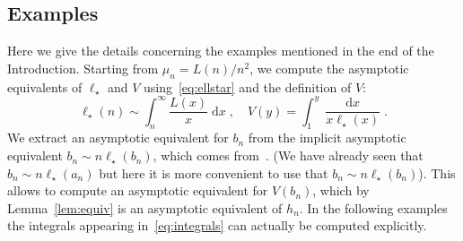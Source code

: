 \documentclass[10pt]{amsart}
\theoremstyle{definition}\newtheorem{defi}[theo]{Definition}\newtheorem{rema}[theo]{Remark}\newtheorem{exam}[theo]{Example}\newtheorem{exem}[theo]{Example}\newtheorem{nota}[theo]{Notation}
\DeclareMathOperator{\dxseq}{d\mathit{x}}
\begin{document}
\subsection{Examples}\label{ssec:examples}

Here we give the details concerning the examples mentioned in the end of the Introduction. Starting from $ \mu_n= {L(n)}/{n^{2}}$, we compute the asymptotic equivalents of $\ell_{\star}$ and $V$ using~\eqref{eq:ellstar} and the definition of $V$:
\begin{equation}\label{eq:integrals}
\ell_{\star}(n)  \sim  \int_{n}^{\infty} \frac{L(x)}{x} \dxseq, \quad V(y)=\int_{1}^{y} \frac{\dxseq}{x \ell_{\star}(x)}.
\end{equation}
We extract an asymptotic equivalent for $b_{n}$ from the implicit asymptotic equivalent $ b_{n} \sim n \ell_{\star}(b_{n})$, which comes from~\cite[Lemma~4.3]{Ber19}. (We have already seen that $ b_{n} \sim n \ell_{\star}(a_{n})$ but here it is more convenient to use that $ b_{n} \sim n \ell_{\star}(b_{n})$). This allows to compute an asymptotic equivalent for $V(b_{n})$, which by Lemma~\ref{lem:equiv} is an asymptotic equivalent of $h_{n}$. In the following examples the integrals appearing in~\eqref{eq:integrals} can actually be computed explicitly.
\end{document}
